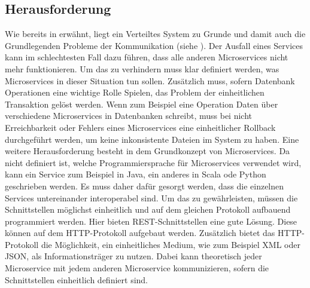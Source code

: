 \subsection{Herausforderung}
\label{sec:Herausforderung}
Wie bereits in  erwähnt, liegt ein Verteiltes System zu Grunde und damit auch die Grundlegenden Probleme der Kommunikation (siehe \cite[S. 25]{EWolff2016:Microservices}).
Der Ausfall eines Services kann im schlechtesten Fall dazu führen, dass alle anderen Microservices nicht mehr funktionieren. Um das zu verhindern muss klar definiert werden, was Microservices in dieser Situation tun sollen. Zusätzlich muss, sofern Datenbank Operationen eine wichtige Rolle Spielen, das Problem der einheitlichen Transaktion gelöst werden. Wenn zum Beispiel eine Operation Daten über verschiedene Microservices in Datenbanken schreibt, muss bei nicht Erreichbarkeit oder Fehlers eines Microservices eine einheitlicher Rollback durchgeführt werden, um keine inkonsistente Dateien im System zu haben.
Eine weitere Herausforderung besteht in dem Grundkonzept von Microservices. Da nicht definiert ist, welche Programmiersprache für Microservices verwendet wird, kann ein Service zum Beispiel in Java, ein anderes in Scala ode Python geschrieben werden. Es muss daher dafür gesorgt werden, dass die einzelnen Services untereinander interoperabel sind. Um das zu gewährleisten, müssen die Schnittstellen möglichst einheitlich und auf dem gleichen Protokoll aufbauend programmiert werden. Hier bieten REST-Schnittstellen eine gute Lösung. Diese können auf dem HTTP-Protokoll aufgebaut werden. Zusätzlich bietet das HTTP-Protokoll die Möglichkeit, ein einheitliches Medium, wie zum Beispiel XML oder JSON, als Informationsträger zu nutzen. Dabei kann theoretisch jeder Microservice mit jedem anderen Microservice kommunizieren, sofern die Schnittstellen einheitlich definiert sind.

